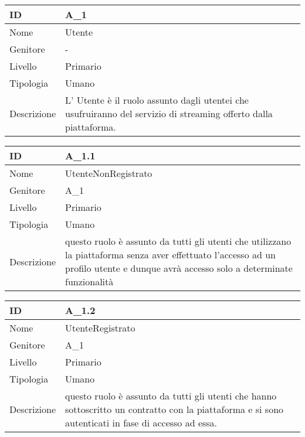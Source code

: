 \begin{center}

\begin{tabular}{ |p{2cm}|p{10cm}|  }
\hline
ID & A\_1 \\\hline
Nome & Utente\\\hline
Genitore & - \\\hline
Livello &  Primario \\\hline
Tipologia & Umano \\\hline
Descrizione &  L' Utente è il ruolo assunto dagli utentei che usufruiranno del servizio di streaming offerto dalla piattaforma. \\\hline
\end{tabular}
\label{table_attore:1}\newline

\begin{tabular}{ |p{2cm}|p{10cm}|  }
\hline
ID & A\_1.1 \\\hline
Nome & UtenteNonRegistrato\\\hline
Genitore & A\_1 \\\hline
Livello &  Primario \\\hline
Tipologia & Umano \\\hline
Descrizione &  questo ruolo è assunto da tutti gli utenti che utilizzano la piattaforma senza aver effettuato l'accesso ad un profilo utente e dunque avrà accesso solo a determinate funzionalità \\\hline
\end{tabular}
\label{table_attore:1.1}\newline

\begin{tabular}{ |p{2cm}|p{10cm}|  }
\hline
ID & A\_1.2 \\\hline
Nome & UtenteRegistrato\\\hline
Genitore & A\_1 \\\hline
Livello &  Primario \\\hline
Tipologia & Umano \\\hline
Descrizione &  questo ruolo è assunto da tutti gli utenti che hanno sottoscritto un contratto con la piattaforma e si sono autenticati in fase di accesso ad essa. \\\hline
\end{tabular}
\label{table_attore:1.2}\newline


\end{center}
